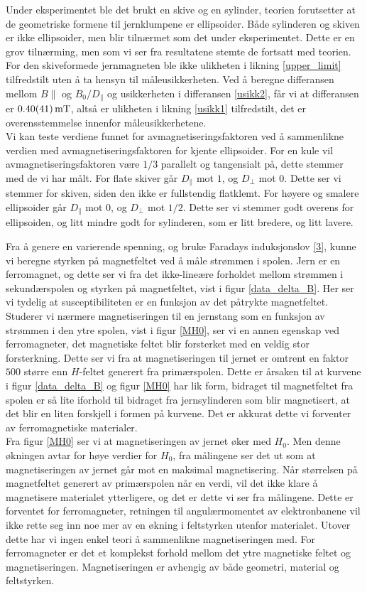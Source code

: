 \documentclass[%
 reprint,
 amsmath,amssymb,
 aps,
 norsk,
]{revtex4-1}
\begin{document}
Under eksperimentet ble det brukt en skive og en sylinder, teorien forutsetter at de geometriske formene til jernklumpene er ellipsoider. Både sylinderen og skiven er ikke ellipsoider, men blir tilnærmet som det under eksperimentet. Dette er en grov tilnærming, men som vi ser fra resultatene stemte de fortsatt med teorien. For den skiveformede jernmagneten ble ikke ulikheten i likning \eqref{upper_limit} tilfredstilt uten å ta hensyn til måleusikkerheten. Ved å beregne differansen mellom $B\parallel$ og $B_0/D_{\parallel}$ og usikkerheten i differansen \eqref{usikk2}, får vi at differansen er $\SI{0.4\pm0.41}{\milli\tesla}$, altså er ulikheten i likning \eqref{usikk1} tilfredstilt, det er overensstemmelse innenfor måleusikkerhetene.\\
Vi kan teste verdiene funnet for avmagnetiseringsfaktoren ved å sammenlikne verdien med avmagnetiseringsfaktoren for kjente ellipsoider. For en kule vil avmagnetiseringsfaktoren være $1/3$ parallelt og tangensialt på, dette stemmer med de vi har målt. For flate skiver går $D_{\parallel}$ mot $1$, og $D_{\perp}$ mot $0$. Dette ser vi stemmer for skiven, siden den ikke er fullstendig flatklemt. For høyere og smalere ellipsoider går $D_{\parallel}$ mot $0$, og $D_{\perp}$ mot $1/2$. Dette ser vi stemmer godt overens for ellipsoiden, og litt mindre godt for sylinderen, som er litt bredere, og litt lavere.
\par
Fra å genere en varierende spenning, og bruke Faradays induksjonslov \eqref{3}, kunne vi beregne styrken på magnetfeltet ved å måle strømmen i spolen. Jern er en ferromagnet, og dette ser vi fra det ikke-lineære forholdet mellom strømmen i sekundærspolen og styrken på magnetfeltet, vist i figur \vref{data_delta_B}. Her ser vi tydelig at susceptibiliteten er en funksjon av det påtrykte magnetfeltet. Studerer vi nærmere magnetiseringen til en jernstang som en funksjon av strømmen i den ytre spolen, vist i figur \vref{MH0}, ser vi en annen egenskap ved ferromagneter, det magnetiske feltet blir forsterket med en veldig stor forsterkning. Dette ser vi fra at magnetiseringen til jernet er omtrent en faktor $500$ større enn $H$-feltet generert fra primærspolen. Dette er årsaken til at kurvene i figur \vref{data_delta_B} og figur \vref{MH0} har lik form, bidraget til magnetfeltet fra spolen er så lite iforhold til bidraget fra jernsylinderen som blir magnetisert, at det blir en liten forskjell i formen på kurvene. Det er akkurat dette vi forventer av ferromagnetiske materialer.\\
Fra figur \vref{MH0} ser vi at magnetiseringen av jernet øker med $H_0$. Men denne økningen avtar for høye verdier for $H_0$, fra målingene ser det ut som at magnetiseringen av jernet går mot en maksimal magnetisering. Når størrelsen på magnetfeltet generert av primærspolen når en verdi, vil det ikke klare å magnetisere materialet ytterligere, og det er dette vi ser fra målingene. Dette er forventet for ferromagneter, retningen til angulærmomentet av elektronbanene vil ikke rette seg inn noe mer av en økning i feltstyrken utenfor materialet. Utover dette har vi ingen enkel teori å sammenlikne magnetiseringen med. For ferromagneter er det et komplekst forhold mellom det ytre magnetiske feltet og magnetiseringen. Magnetiseringen er avhengig av både geometri, material og feltstyrken.
\end{document}
